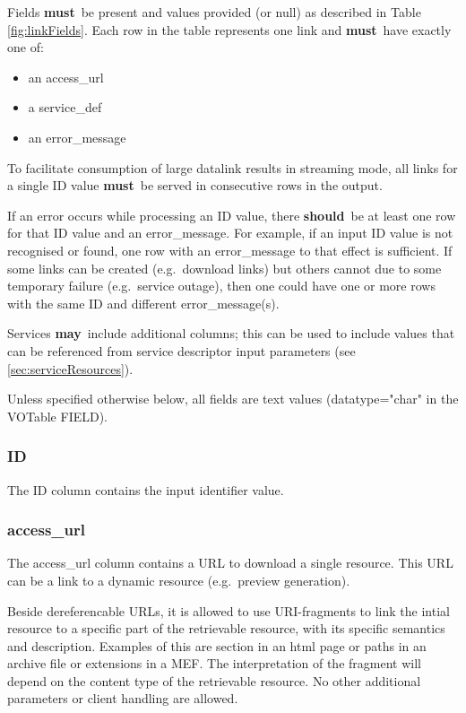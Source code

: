 \documentclass[11pt,a4paper]{ivoa}
\newcommand{\attval}[2]{#1={\allowbreak}{"}#2{"}}
\newcommand{\rfcmust}{\textbf{must}}
\newcommand{\rfcshould}{\textbf{should}}
\newcommand{\rfcmay}{\textbf{may}}
\begin{document}
Fields \rfcmust\ be present and values provided
(or null) as described in Table \ref{fig:linkFields}. Each row in the table
represents one link and \rfcmust\ have exactly one of:
\begin{itemize}
  \item an access\_url
  \item a service\_def
  \item an error\_message
\end{itemize}

To facilitate consumption of large datalink results in streaming mode, all links 
for a single ID value \rfcmust\ be served in consecutive rows in the output.

If an error occurs while processing an ID value, there \rfcshould\ be at least
one row for that ID value and an error\_message. For example, if an input
ID value is not recognised or found, one row with an error\_message
to that effect is sufficient.
If some links can be created (e.g.\ download links)
but others cannot due to some temporary failure (e.g.\ service outage),
then one could have one or more rows with the same ID and different
error\_message(s).

Services \rfcmay\ include additional columns; this can be used to include
values that can be referenced from service descriptor input parameters
(see \ref{sec:serviceResources}).

Unless specified otherwise below, all fields are text values (\attval{datatype}{char} 
in the VOTable FIELD).

\subsubsection{ID}

The ID column contains the input identifier value.


\subsubsection{access\_url}

The access\_url column contains a URL to download a single resource.
This URL can be a link to a dynamic resource (e.g.\ preview generation).

Beside dereferencable URLs, it is allowed to use URI-fragments to link
the intial resource to a specific part of the retrievable resource, with
its specific semantics and description. Examples of this are section
in an html page or paths in an archive file or extensions in a MEF.
The interpretation of the fragment will depend on the content type
of the retrievable resource.  No other additional parameters or client
handling are allowed.
\end{document}
